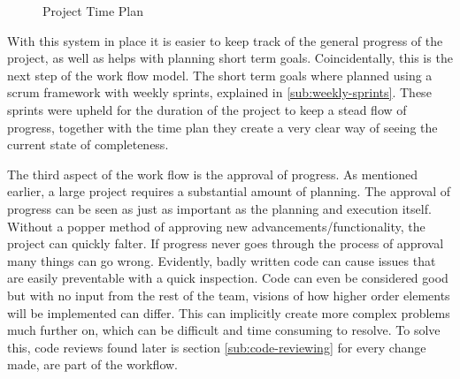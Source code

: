    \begin{figure}[H]
        \centering
        \caption{Project Time Plan}
        \label{fig:time-plan}
    \end{figure}

    With this system in place it is easier to keep track of the general progress of the project, as well as helps with planning short term goals. Coincidentally, this is the next step of the work flow model. The short term goals where planned using a scrum framework with weekly sprints, explained in \ref{sub:weekly-sprints}. These sprints were upheld for the duration of the project to keep a stead flow of progress, together with the time plan they create a very clear way of seeing the current state of completeness. 

    The third aspect of the work flow is the approval of progress. As mentioned earlier, a large project requires a substantial amount of planning. The approval of progress can be seen as just as important as the planning and execution itself. Without a popper method of approving new advancements/functionality, the project can quickly falter. If progress never goes through the process of approval many things can go wrong. Evidently, badly written code can cause issues that are easily preventable with a quick inspection. Code can even be considered good but with no input from the rest of the team, visions of how higher order elements will be implemented can differ. This can implicitly create  more complex problems much further on, which can be difficult and time consuming to resolve. To solve this, code reviews found later is section \ref{sub:code-reviewing} for every change made, are part of the workflow.  

